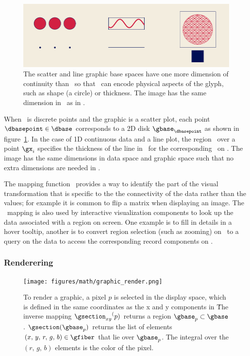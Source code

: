 \documentclass[../main.tex]{subfiles}
\begin{document}
\begin{figure}
    \includegraphics[width=1\textwidth]{figures/math/retraction_maps.png}
    \caption{The scatter and line graphic base spaces have one more dimension of continuity than \dbase\ so that \gbase\ can encode physical aspects of the glyph, such as shape (a circle) or thickness. The image has the same dimension in \gbase\ as in \dbase. }
    \label{fig:graphic_retraction_map}
\end{figure}

When \dbase\ is discrete points and the graphic is a scatter plot, each point $\dbasepoint \in \dbase$ corresponds to a 2D disk $\gbase_{\dbasepoint}$ as shown in figure~\ref{fig:graphic_retraction_map}. In the case of 1D continuous data and a line plot, the region \gy\ over a point $\gx_i$ specifies the thickness of the line in \gbase\ for the corresponding \dsection\ on \dbasepoint. The image has the same dimensions in data space and graphic space such that no extra dimensions are needed in \gbase. 

The mapping function \vindex\ provides a way to identify the part of the visual transformation that is specific to the the connectivity of the data rather than the values; for example it is common to flip a matrix when displaying an image. The \vindex\ mapping is also used by interactive visualization components to look up the data associated with a region on screen.  One example is to fill in details in a hover tooltip, another is to convert region selection (such as zooming) on \gbase\ to a query on the data to access the corresponding record components on \dbase.

\subsubsection{Renderering \gsection}
\label{sec:graphic_section}
\begin{figure}
    \texttt{[image: figures/math/graphic\_render.png]}
    \caption{To render a graphic, a pixel $p$ is selected in the display space, which is defined in the same coordinates as the x and y components in \gfiber\.  The inverse mapping ${\gsection_{xy}}^(p)$ returns a region $\gbase_{p} \subset \gbase$. $\gsection(\gbase_{p})$ returns the list of elements $(x,\,y,\,r,\,g,\,b) \in \gfiber$ that lie over $\gbase_{p}$. The integral over the $(r,\,g,\,b)$ elements is the color of the pixel.}
    \label{fig:graphic_rho_lookup}
\end{figure}
\end{document}
